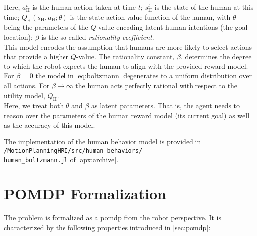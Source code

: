 Here, $a^t_\text{H}$ is the human action taken at time $t$; $s^t_\text{H}$ is
the state of the human at this time; $Q_\text{H}(s_\text{H}, a_\text{H}; \theta)$ is the
state-action value function of the human, with $\theta$ being the parameters of the
$Q$-value encoding latent human intentions (\eg the goal location); $\beta$ is
the so called \emph{rationality coefficient}.\\
This model encodes the assumption that humans are more likely to select actions that
provide a higher $Q$-value. The rationality constant, $\beta$, determines the
degree to which the robot expects the human to align with the provided reward
model. For $\beta = 0$ the model in \cref{eq:boltzmann} degenerates to
a uniform distribution over all actions. For $\beta \to \infty$ the human acts
perfectly rational with respect to the utility model,
$Q_\text{H}$.\\
Here, we treat both $\theta$ and $\beta$ as latent parameters. That is, the
agent needs to reason over the parameters of the human reward model (\eg its
current goal) as well as the accuracy of this model.

The implementation of the human behavior model is provided in
\texttt{\appdata/MotionPlanningHRI/src/human\_behaviors/\\human\_boltzmann.jl} of \cref{apx:archive}.

\section{POMDP Formalization}\label{sec:hri-pomdp-formalization}

The problem is formalized as a \ac{pomdp} from the robot perspective. It is
characterized by the following properties introduced in \cref{sec:pomdp}:

